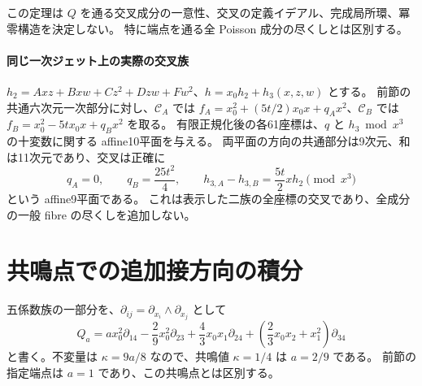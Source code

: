 \documentclass[11pt,a4paper]{ltjsarticle}
\theoremstyle{remark}
\begin{document}
この定理は $Q$ を通る交叉成分の一意性、交叉の定義イデアル、完成局所環、冪零構造を決定しない。
特に端点を通る全 Poisson 成分の尽くしとは区別する。

\paragraph{同じ一次ジェット上の実際の交叉族}
$h_2=Axz+Bxw+Cz^2+Dzw+Fw^2$、$h=x_0h_2+h_3(x,z,w)$ とする。
前節の共通六次元一次部分に対し、$\mathcal C_A$ では
$f_A=x_0^2+(5t/2)x_0x+q_Ax^2$、$\mathcal C_B$ では
$f_B=x_0^2-5tx_0x+q_Bx^2$ を取る。
有限正規化後の各61座標は、$q$ と $h_3\bmod x^3$ の十変数に関する affine10平面を与える。
両平面の方向の共通部分は9次元、和は11次元であり、交叉は正確に
\[
 q_A=0,\qquad q_B=\frac{25t^2}{4},\qquad
 h_{3,A}-h_{3,B}=\frac{5t}{2}xh_2\pmod{x^3}
\]
という affine9平面である\cite{ambient-fixed-jet-v62}。
これは表示した二族の全座標の交叉であり、全成分の一般 fibre の尽くしを追加しない。

\section{共鳴点での追加接方向の積分}\label{sec:resonant-direction-v62}
五係数族の一部分を、$\partial_{ij}=\partial_{x_i}\wedge\partial_{x_j}$ として
\[
 Q_a=ax_0^2\partial_{14}-\frac29x_0^2\partial_{23}
       +\frac43x_0x_1\partial_{24}
       +\left(\frac23x_0x_2+x_1^2\right)\partial_{34}
\]
と書く。不変量は $\kappa=9a/8$ なので、共鳴値 $\kappa=1/4$ は $a=2/9$ である。
前節の指定端点は $a=1$ であり、この共鳴点とは区別する。
\end{document}
